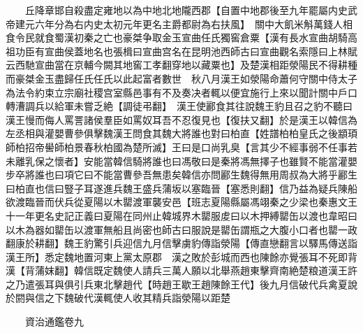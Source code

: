 　　丘降章邯自殺盡定雍地以為中地北地隴西郡【自置中地郡後至九年罷屬内史武帝建元六年分為右内史太初元年更名主爵都尉為右扶風】　關中大飢米斛萬錢人相食令民就食蜀漢初秦之亡也豪桀争取金玉宣曲任氏獨窖倉粟【漢有長水宣曲胡騎高祖功臣有宣曲侯蓋地名也張楫曰宣曲宫名在昆明池西師古曰宣曲觀名索隱曰上林賦云西馳宣曲當在京輔今闕其地窖工孝翻穿地以藏粟也】及楚漢相距滎陽民不得耕種而豪桀金玉盡歸任氏任氏以此起富者數世　秋八月漢王如滎陽命蕭何守關中侍太子為法令約束立宗廟社稷宫室縣邑事有不及奏决者輒以便宜施行上來以聞計關中戶口轉漕調兵以給軍未嘗乏絶【調徒弔翻】　漢王使酈食其往說魏王豹且召之豹不聽曰漢王慢而侮人罵詈諸侯羣臣如罵奴耳吾不忍復見也【復扶又翻】於是漢王以韓信為左丞相與灌嬰曹參俱擊魏漢王問食其魏大將誰也對曰柏直【姓譜柏柏皇氏之後顓頊師柏招帝嚳師柏景春秋柏國為楚所滅】王曰是口尚乳臭【言其少不經事弱不任事若未離乳保之懷者】安能當韓信騎將誰也曰馮敬曰是秦將馮無擇子也雖賢不能當灌嬰步卒將誰也曰項它曰不能當曹參吾無患矣韓信亦問酈生魏得無用周叔為大將乎酈生曰柏直也信曰豎子耳遂進兵魏王盛兵蒲坂以塞臨晉【塞悉則翻】信乃益為疑兵陳船欲渡臨晉而伏兵從夏陽以木罌渡軍襲安邑【班志夏陽縣屬馮翊秦之少梁也秦惠文王十一年更名史記正義曰夏陽在同州止韓城界木罌服䖍曰以木押縛罌缶以渡也韋昭曰以木為器如罌缶以渡軍無船且尚密也師古曰服說是罌缶謂瓶之大腹小口者也罌一政翻康於耕翻】魏王豹驚引兵迎信九月信擊虜豹傳詣滎陽【傳直戀翻言以驛馬傳送詣漢王所】悉定魏地置河東上黨太原郡　漢之敗於彭城而西也陳餘亦覺張耳不死即背漢【背蒲妺翻】韓信既定魏使人請兵三萬人願以北舉燕趙東擊齊南絶楚粮道漢王許之乃遣張耳與俱引兵東北擊趙代【時趙王歇王趙陳餘王代】後九月信破代兵禽夏說於閼與信之下魏破代漢輒使人收其精兵詣滎陽以距楚

　　資治通鑑卷九  
    


 


 



 

 
  







 


　　
　　
　
　
　


　　

　















